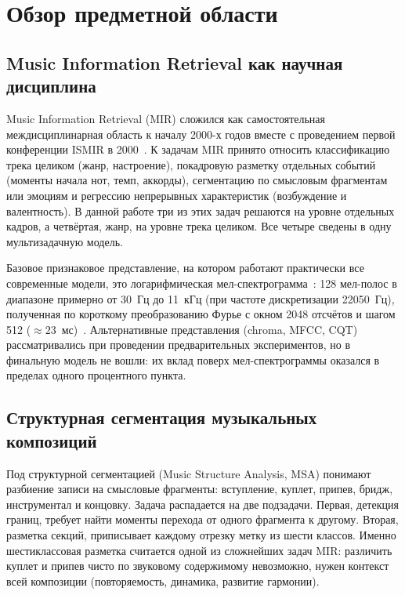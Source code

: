 \chapter{Обзор предметной области}\label{ch:1}

\section{Music Information Retrieval как научная дисциплина}\label{sec:1-1}

Music Information Retrieval (MIR) сложился как самостоятельная междисциплинарная область к началу 2000-х годов вместе с проведением первой конференции ISMIR в 2000~\cite{downie2003mir}. К задачам MIR принято относить классификацию трека целиком (жанр, настроение), покадровую разметку отдельных событий (моменты начала нот, темп, аккорды), сегментацию по смысловым фрагментам или эмоциям и регрессию непрерывных характеристик (возбуждение и валентность). В данной работе три из этих задач решаются на уровне отдельных кадров, а четвёртая, жанр, на уровне трека целиком. Все четыре сведены в одну мультизадачную модель.

Базовое признаковое представление, на котором работают практически все современные модели, это логарифмическая мел-спектрограмма~\cite{stevens1937mel}: 128 мел-полос в диапазоне примерно от 30~Гц до 11~кГц (при частоте дискретизации 22050~Гц), полученная по короткому преобразованию Фурье с окном 2048 отсчётов и шагом 512 ($\approx 23$~мс)~\cite{choi2017tutorial,kong2020panns}. Альтернативные представления (chroma, MFCC, CQT) рассматривались при проведении предварительных экспериментов, но в финальную модель не вошли: их вклад поверх мел-спектрограммы оказался в пределах одного процентного пункта.

\section{Структурная сегментация музыкальных композиций}\label{sec:1-2}

Под структурной сегментацией (Music Structure Analysis, MSA) понимают разбиение записи на смысловые фрагменты: вступление, куплет, припев, бридж, инструментал и концовку. Задача распадается на две подзадачи. Первая, детекция границ, требует найти моменты перехода от одного фрагмента к другому. Вторая, разметка секций, приписывает каждому отрезку метку из шести классов. Именно шестиклассовая разметка считается одной из сложнейших задач MIR: различить куплет и припев чисто по звуковому содержимому невозможно, нужен контекст всей композиции (повторяемость, динамика, развитие гармонии).

